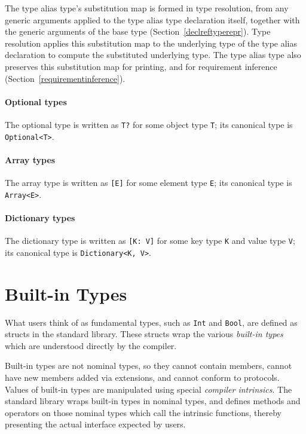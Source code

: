 \documentclass[a4paper,headsepline,bibliography=totoc,toc=flat,fleqn,twoside=semi]{scrbook}
\theoremstyle{definition}
\theoremstyle{definition}
\theoremstyle{definition}
\begin{document}
The type alias type's substitution map is formed in type resolution, from any generic arguments applied to the type alias type declaration itself, together with the generic arguments of the base type (Section~\ref{declreftyperepr}). Type resolution applies this substitution map to the underlying type of the type alias declaration to compute the substituted underlying type. The type alias type also preserves this substitution map for printing, and for requirement inference (Section~\ref{requirementinference}).

\paragraph{Optional types} The optional type is written as \texttt{T?} for some object type \texttt{T}; its canonical type is \texttt{Optional<T>}.

\paragraph{Array types} The array type is written as \texttt{[E]} for some element type \texttt{E}; its canonical type is \texttt{Array<E>}.

\paragraph{Dictionary types} The dictionary type is written as \texttt{[K: V]} for some key type \texttt{K} and value type \texttt{V}; its canonical type is \texttt{Dictionary<K, V>}.

\section{Built-in Types}\label{builtin type}

What users think of as fundamental types, such as \texttt{Int} and \texttt{Bool}, are defined as structs in the standard library. These structs wrap the various \emph{built-in types} which are understood directly by the compiler.

Built-in types are not nominal types, so they cannot contain members, cannot have new members added via extensions, and cannot conform to protocols. Values of built-in types are manipulated using special \emph{compiler intrinsics}. The standard library wraps built-in types in nominal types, and defines methods and operators on those nominal types which call the intrinsic functions, thereby presenting the actual interface expected by users.
\end{document}
